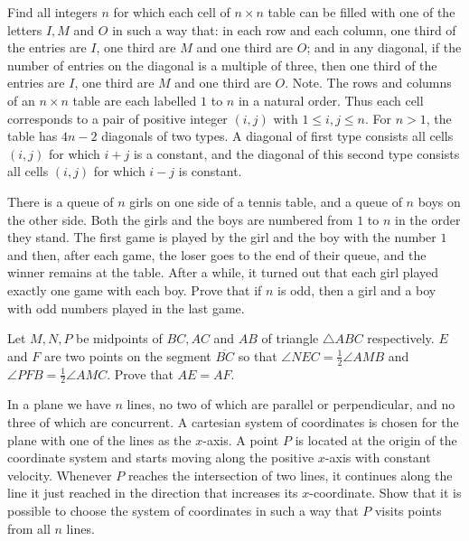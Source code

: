 \documentclass[11pt]{scrartcl}
\begin{document}
\begin{problem}[7902258516875436315]
Find all integers $n$ for which each cell of $n \times n$ table can be filled with one of the letters $I,M$ and $O$ in such a way that:
in each row and each column, one third of the entries are $I$, one third are $M$ and one third are $O$; and 
in any diagonal, if the number of entries on the diagonal is a multiple of three, then one third of the entries are $I$, one third are $M$ and one third are $O$.
Note. The rows and columns of an $n \times n$ table are each labelled $1$ to $n$ in a natural order. Thus each cell corresponds to a pair of positive integer $(i,j)$ with $1 \le i,j \le n$. For $n>1$, the table has $4n-2$ diagonals of two types. A diagonal of first type consists all cells $(i,j)$ for which $i+j$ is a constant, and the diagonal of this second type consists all cells $(i,j)$ for which $i-j$ is constant.
\end{problem}
\begin{problem}[259897104343709]
	There is a queue of $n{}$ girls on one side of a tennis table, and a queue of $n{}$ boys on the other side. Both the girls and the boys are numbered from $1{}$ to $n{}$ in the order they stand. The first game is played by the girl and the boy with the number $1{}$ and then, after each game, the loser goes to the end of their queue, and the winner remains at the table. After a while, it turned out that each girl played exactly one game with each boy. Prove that if $n{}$ is odd, then a girl and a boy with odd numbers played in the last game.
\end{problem}
\begin{problem}[584014589745861]
Let $M,N,P$ be midpoints of $BC,AC$ and $AB$ of triangle $\triangle ABC$ respectively. $E$ and $F$ are two points on the segment $\overline{BC}$ so that $\angle NEC = \frac{1}{2} \angle AMB$ and $\angle PFB = \frac{1}{2} \angle AMC$. Prove that $AE=AF$.
\end{problem}
\begin{problem}[6703839677147050695]
	In a plane we have $n$ lines, no two of which are parallel or perpendicular, and no three of which are concurrent. A cartesian system of coordinates is chosen for the plane with one of the lines as the $x$-axis. A point $P$ is located at the origin of the coordinate system and starts moving along the positive $x$-axis with constant velocity. Whenever $P$ reaches the intersection of two lines, it continues along the line it just reached in the direction that increases its $x$-coordinate. Show that it is possible to choose the system of coordinates in such a way that $P$ visits points from all $n$ lines.
\end{problem}
\end{document}
